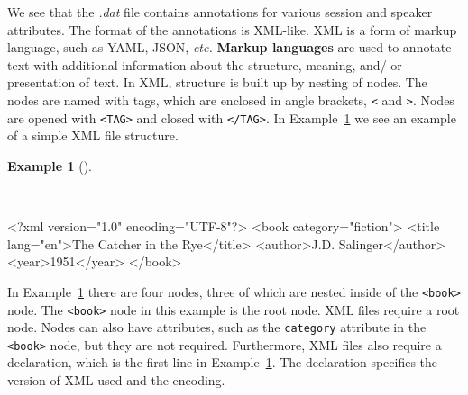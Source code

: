 \documentclass[
  letterpaper,
  DIV=11,
  numbers=noendperiod]{scrreport}
\newenvironment{Shaded}{\begin{snugshade}}{\end{snugshade}}
\newcommand{\FunctionTok}[1]{\textcolor[rgb]{0.00,0.00,0.00}{#1}}
\newcommand{\KeywordTok}[1]{\textcolor[rgb]{0.00,0.00,0.00}{#1}}
\newcommand{\NormalTok}[1]{\textcolor[rgb]{0.00,0.00,0.00}{#1}}
\newcommand{\OtherTok}[1]{\textcolor[rgb]{0.00,0.00,0.00}{#1}}
\newcommand{\StringTok}[1]{\textcolor[rgb]{0.00,0.00,0.00}{#1}}
\theoremstyle{definition}
\newtheorem{example}{Example}[chapter]
\theoremstyle{remark}
\begin{document}
We see that the \emph{.dat} file contains annotations for various
session and speaker attributes. The format of the annotations is
XML-like. XML is a form of markup language, such as YAML, JSON,
\emph{etc.} \textbf{Markup languages} are used to annotate text with
additional information about the structure, meaning, and/ or
presentation of text. In XML, structure is built up by nesting of nodes.
The nodes are named with tags, which are enclosed in angle brackets,
\texttt{\textless{}} and \texttt{\textgreater{}}. Nodes are opened with
\texttt{\textless{}TAG\textgreater{}} and closed with
\texttt{\textless{}/TAG\textgreater{}}. In Example~\ref{exm-cd-xml} we
see an example of a simple XML file structure.

\begin{example}[]\protect\hypertarget{exm-cd-xml}{}\label{exm-cd-xml}

~

\begin{Shaded}
\begin{Highlighting}[]
\FunctionTok{\textless{}?xml}\OtherTok{ version=}\StringTok{"1.0"}\OtherTok{ encoding=}\StringTok{"UTF{-}8"}\FunctionTok{?\textgreater{}}
\NormalTok{\textless{}}\KeywordTok{book}\OtherTok{ category=}\StringTok{"fiction"}\NormalTok{\textgreater{}}
\NormalTok{  \textless{}}\KeywordTok{title}\OtherTok{ lang=}\StringTok{"en"}\NormalTok{\textgreater{}The Catcher in the Rye\textless{}/}\KeywordTok{title}\NormalTok{\textgreater{}}
\NormalTok{  \textless{}}\KeywordTok{author}\NormalTok{\textgreater{}J.D. Salinger\textless{}/}\KeywordTok{author}\NormalTok{\textgreater{}}
\NormalTok{  \textless{}}\KeywordTok{year}\NormalTok{\textgreater{}1951\textless{}/}\KeywordTok{year}\NormalTok{\textgreater{}}
\NormalTok{\textless{}/}\KeywordTok{book}\NormalTok{\textgreater{}}
\end{Highlighting}
\end{Shaded}

\end{example}

In Example~\ref{exm-cd-xml} there are four nodes, three of which are
nested inside of the \texttt{\textless{}book\textgreater{}} node. The
\texttt{\textless{}book\textgreater{}} node in this example is the root
node. XML files require a root node. Nodes can also have attributes,
such as the \texttt{category} attribute in the
\texttt{\textless{}book\textgreater{}} node, but they are not required.
Furthermore, XML files also require a declaration, which is the first
line in Example~\ref{exm-cd-xml}. The declaration specifies the version
of XML used and the encoding.
\end{document}
